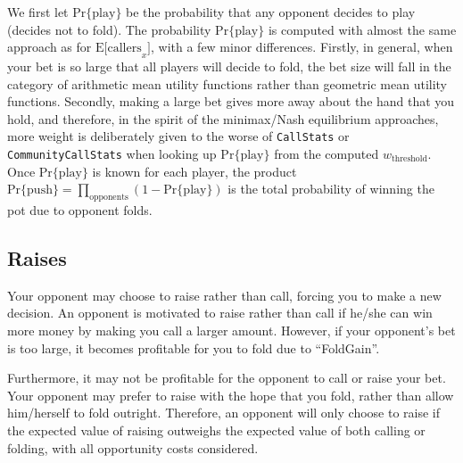 We first let $\mathrm{Pr\{play\}}$ be the probability that any opponent decides to play (decides not to fold).
The probability $\mathrm{Pr\{play\}}$ is computed with almost the same approach as for $\mathrm{E[callers}_x]$, with a few minor differences.
Firstly, in general, when your bet is so large that all players will decide to fold, the bet size will fall in the category of arithmetic mean utility functions rather than geometric mean utility functions.
Secondly, making a large bet gives more away about the hand that you hold, and therefore, in the spirit of the minimax/Nash equilibrium approaches, more weight is deliberately given to the worse of \texttt{CallStats} or \texttt{CommunityCallStats} when looking up $\mathrm{Pr\{play\}}$ from the computed $w_{\mathrm{threshold}}$.
Once $\mathrm{Pr\{play\}}$ is known for each player, the product $\mathrm{Pr\{push\}} = \prod_{\mathrm{opponents}} \left( 1 - \mathrm{Pr\{play\}} \right)$ is the total probability of winning the pot due to opponent folds.



\subsection{Raises}
\label{sec:Raises}
Your opponent may choose to raise rather than call, forcing you to make a new decision.
An opponent is motivated to raise rather than call if he/she can win more money by making you call a larger amount.
However, if your opponent's bet is too large, it becomes profitable for you to fold due to ``FoldGain''.

Furthermore, it may not be profitable for the opponent to call or raise your bet.
Your opponent may prefer to raise with the hope that you fold, rather than allow him/herself to fold outright.
Therefore, an opponent will only choose to raise if the expected value of raising outweighs the expected value of both calling or folding, with all opportunity costs considered.

